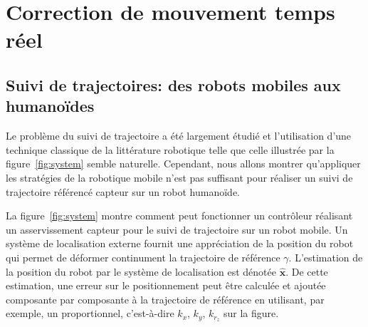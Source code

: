 \section{Correction de mouvement temps réel}
\subsection{Suivi de trajectoires: des robots mobiles aux humanoïdes}


Le problème du suivi de trajectoire a été largement étudié et
l'utilisation d'une technique classique de la littérature robotique
telle que celle illustrée par la figure \ref{fig:system} semble
naturelle. Cependant, nous allons montrer qu'appliquer les stratégies de
la robotique mobile n'est pas suffisant pour réaliser un suivi de
trajectoire référencé capteur sur un robot humanoïde.


La figure \ref{fig:system} montre comment peut fonctionner un
contrôleur réalisant un asservissement capteur pour le suivi de
trajectoire sur un robot mobile. Un système de localisation externe
fournit une appréciation de la position du robot qui permet de
déformer continument la trajectoire de référence
$\gamma$. L'estimation de la position du robot par le système de
localisation est dénotée $\hat{\mathbf{x}}$. De cette estimation, une
erreur sur le positionnement peut être calculée et ajoutée composante
par composante à la trajectoire de référence en utilisant, par
exemple, un proportionnel, c'est-à-dire $k_x$, $k_y$, $k_{r_z}$ sur la
figure.


